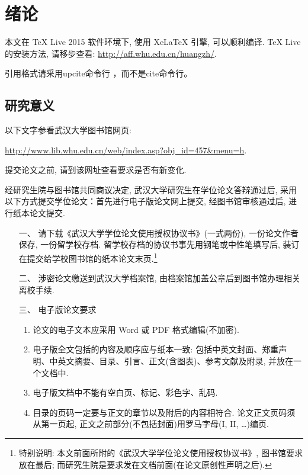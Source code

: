 \chapter{绪论}

本文在 TeX Live 2015 软件环境下, 使用 XeLaTeX 引擎, 可以顺利编译.
TeX Live 的安装方法, 请移步查看: \url{http://aff.whu.edu.cn/huangzh/}.


引用格式请采用upcite命令行
，而不是cite命令行\cite{AlquezarS96,AlquezarS97}。





\section{研究意义}


{\kaishu 以下文字参看武汉大学图书馆网页:
 \begin{center}
 \url{http://www.lib.whu.edu.cn/web/index.asp?obj_id=457&menu=h}.
 \end{center}
 提交论文之前, 请到该网址查看要求是否有新变化.
}



经研究生院与图书馆共同商议决定, 武汉大学研究生在学位论文答辩通过后,
采用以下方式提交学位论文：首先进行电子版论文网上提交, 经图书馆审核通过后, 进行纸本论文提交.

\begin{itemize}
  \item[一、] 请下载《武汉大学学位论文使用授权协议书》(一式两份), 一份论文作者保存, 一份留学校存档.
    留学校存档的协议书事先用钢笔或中性笔填写后,  装订在提交给学校图书馆的纸本论文末页.\footnote{\heiti 特别说明:
    本文前面所附的《武汉大学学位论文使用授权协议书》, 图书馆要求放在最后;
    而研究生院是要求发在文档前面(在论文原创性声明之后). }

    \item[二、]涉密论文缴送到武汉大学档案馆, 由档案馆加盖公章后到图书馆办理相关离校手续.

    \item[三、]电子版论文要求
    

\begin{enumerate}[1.]

  \item 论文的电子文本应采用 Word 或 PDF 格式编辑(不加密).
  \item 电子版全文包括的内容及顺序应与纸本一致: 包括中英文封面、郑重声明、中英文摘要、目录、引言、正文(含图表)、参考文献及附录, 并放在一个文档中.
  \item 电子版文档中不能有空白页、标记、彩色字、乱码.
  \item 目录的页码一定要与正文的章节以及附后的内容相符合. 论文正文页码须从第一页起, 正文之前部分(不包括封面)用罗马字母(I, II, \dots)编页.
\end{enumerate}
\end{itemize}





